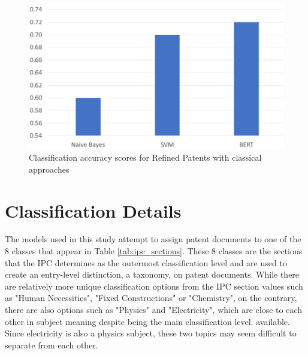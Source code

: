 \documentclass{iyte}
\begin{document}
\begin{figure}[ht]
\includegraphics[width=15cm]{images/classical_eval2.png}
\caption{Classification accuracy scores for Refined Patents with classical approaches}
\label{chart:classical_eval}
\end{figure}

\section{Classification Details}

The models used in this study attempt to assign patent documents to one of the 8 classes that appear in Table \ref{tab:ipc_sections}. These 8 classes are the sections that the IPC determines as the outermost classification level and are used to create an entry-level distinction, a taxonomy, on patent documents. While there are relatively more unique classification options from the IPC section values such as "Human Necessities", "Fixed Constructions" or "Chemistry", on the contrary, there are also options such as "Physics" and "Electricity", which are close to each other in subject meaning despite being the main classification level. available. Since electricity is also a physics subject, these two topics may seem difficult to separate from each other.
\end{document}
